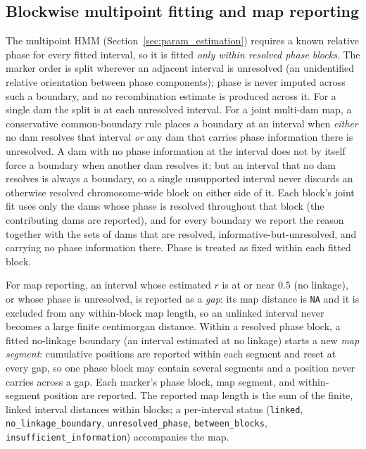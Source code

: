 \documentclass[11pt]{article}
\begin{document}
\subsection{Blockwise multipoint fitting and map reporting} \label{sec:blocks}
The multipoint HMM (Section~\ref{sec:param_estimation}) requires a known relative phase for every
fitted interval, so it is fitted \emph{only within resolved phase blocks}. The marker order is split
wherever an adjacent interval is unresolved (an unidentified relative orientation between phase
components); phase is never imputed across such a boundary, and no recombination estimate is produced
across it. For a single dam the split is at each unresolved interval. For a joint multi-dam map, a
conservative common-boundary rule places a boundary at an interval when \emph{either} no dam
resolves that interval \emph{or} any dam that carries phase information there is unresolved. A dam
with no phase information at the interval does not by itself force a boundary when another dam
resolves it; but an interval that no dam resolves is always a boundary, so a single unsupported
interval never discards an otherwise resolved chromosome-wide block on either side of it. Each
block's joint fit uses only the dams whose phase is resolved throughout that block (the contributing
dams are reported), and for every boundary we report the reason together with the sets of dams that
are resolved, informative-but-unresolved, and carrying no phase information there. Phase is treated
as fixed within each fitted block.

For map reporting, an interval whose estimated $r$ is at or near $0.5$ (no linkage), or whose phase is
unresolved, is reported as a \emph{gap}: its map distance is \texttt{NA} and it is excluded from any
within-block map length, so an unlinked interval never becomes a large finite centimorgan distance.
Within a resolved phase block, a fitted no-linkage boundary (an interval estimated at no linkage)
starts a new \emph{map segment}: cumulative positions are reported within each segment and reset at
every gap, so one phase block may contain several segments and a position never carries across a gap.
Each marker's phase block, map segment, and within-segment position are reported. The reported map
length is the sum of the finite, linked interval distances within blocks; a per-interval status
(\texttt{linked}, \texttt{no\_linkage\_boundary}, \texttt{unresolved\_phase}, \texttt{between\_blocks},
\texttt{insufficient\_information}) accompanies the map.


\end{document}
